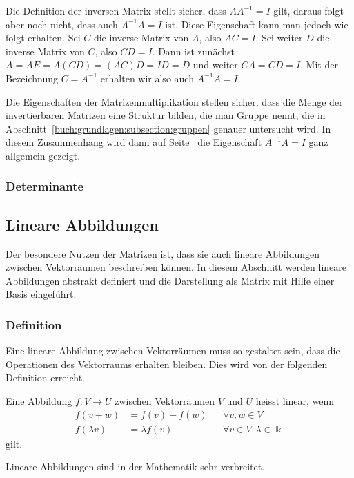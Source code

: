 Die Definition der inversen Matrix stellt sicher, dass $AA^{-1}=I$ gilt,
daraus folgt aber noch nicht, dass auch $A^{-1}A=I$ ist.
Diese Eigenschaft kann man jedoch wie folgt erhalten.
Sei $C$ die inverse Matrix von $A$, also $AC=I$.
Sei weiter $D$ die inverse Matrix von $C$, also $CD=I$.
Dann ist zunächst $A=AE=A(CD)=(AC)D=ID=D$ und weiter
$CA=CD=I$.
Mit der Bezeichnung $C=A^{-1}$ erhalten wir also auch $A^{-1}A=I$.

Die Eigenschaften der Matrizenmultiplikation stellen sicher,
dass die Menge der invertierbaren Matrizen eine Struktur bilden,
die man Gruppe nennt, die in Abschnitt~\ref{buch:grundlagen:subsection:gruppen}
genauer untersucht wird.
In diesem Zusammenhang wird dann auf
Seite~\pageref{buch:vektorenmatrizen:satz:gruppenregeln}
die Eigenschaft $A^{-1}A=I$ ganz allgemein gezeigt.

\subsubsection{Determinante}

%
%
\subsection{Lineare Abbildungen
\label{buch:grundlagen:subsection:lineare-abbildungen}}
Der besondere Nutzen der Matrizen ist, dass sie auch lineare Abbildungen
zwischen Vektorräumen beschreiben können.
In diesem Abschnitt werden lineare Abbildungen abstrakt definiert
und die Darstellung als Matrix mit Hilfe einer Basis eingeführt.


\subsubsection{Definition}
Eine lineare Abbildung zwischen Vektorräumen muss so gestaltet sein,
dass die Operationen des Vektorraums erhalten bleiben.
Dies wird von der folgenden Definition erreicht.

\begin{definition}
Eine Abbildung $f\colon V\to U$ zwischen Vektorräumen $V$ und $U$
heisst linear, wenn
\[
\begin{aligned}
f(v+w) &= f(v) + f(w)&&\forall v,w\in V 
\\
f(\lambda v) &= \lambda f(v) &&\forall v\in V,\lambda \in \Bbbk
\end{aligned}
\]
gilt.
\end{definition}

Lineare Abbildungen sind in der Mathematik sehr verbreitet.


